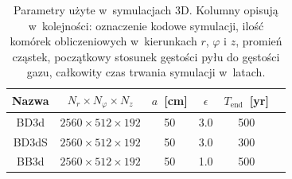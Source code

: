 \begin{table}
   \centering
   \begin{tabular}{cccccc}
      \hline
      Nazwa & $N_r \times N_\varphi \times N_z$ &
      $a$~[cm] & $\epsilon$ & $T_\textrm{end}$~[yr] \\
      \hline
      BD3d  &  $2560  \times 512 \times 192$  & 50  & 3.0 & 500  \\
      BD3dS &  $2560  \times 512 \times 192$  & 50  & 3.0 & 300  \\
      BB3d  &  $2560  \times 512 \times 192$  & 50  & 1.0 & 500  \\
      \hline
   \end{tabular}
\caption{Parametry użyte w~symulacjach 3D. Kolumny opisują w~kolejności: oznaczenie
   kodowe symulacji, ilość komórek obliczeniowych w~kierunkach $r$, $\varphi$ i
   $z$, promień cząstek, początkowy stosunek gęstości pyłu do gęstości gazu,
całkowity czas trwania symulacji w~latach.}
\label{tab2}
\end{table}


